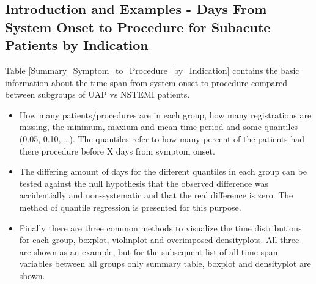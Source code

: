 \documentclass[presentation,xcolor=pdftex,dvipsnames,table,11pt]{beamer}
\begin{document}
\begin{tiny}
\subsection{Introduction and Examples - Days From System Onset to Procedure for Subacute Patients by Indication}

\begin{frame}
Table \ref{Summary_Symptom_to_Procedure_by_Indication} contains the basic information about the time span from system onset to procedure compared between subgroups of UAP vs NSTEMI patients.
\begin{itemize}
  \item{How many patients/procedures are in each group, how many registrations are missing, the minimum, maxium and mean time period and some quantiles (0.05, 0.10, \ldots). The quantiles refer to how many percent of the patients had there procedure before X days from symptom onset.}
  \item{The differing amount of days for the different quantiles in each group can be tested against the null hypothesis that the observed difference was accidentially and non-systematic and that the real difference is zero. The method of quantile regression is presented for this purpose.}
  \item{Finally there are three common methods to visualize the time distributions for each group, boxplot, violinplot and overimposed densityplots. All three are shown as an example, but for the subsequent list of all time span variables between all groups only summary table, boxplot and densityplot are shown.}
\end{itemize}
\end{frame}



\end{tiny}
\end{document}
